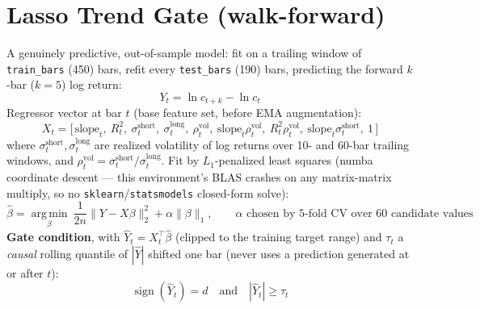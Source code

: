 \documentclass[11pt]{article}
\begin{document}
\section{Lasso Trend Gate (walk-forward)}
A genuinely predictive, out-of-sample model: fit on a trailing window of \texttt{train\_bars}
(450) bars, refit every \texttt{test\_bars} (190) bars, predicting the forward $k$-bar
($k=5$) log return:
\[
Y_t = \ln c_{t+k} - \ln c_t
\]
Regressor vector at bar $t$ (base feature set, before EMA augmentation):
\[
X_t = \big[\,\mathrm{slope}_t,\ R^2_t,\ \sigma^{\mathrm{short}}_t,\ \sigma^{\mathrm{long}}_t,\
\rho^{\mathrm{vol}}_t,\ \mathrm{slope}_t\rho^{\mathrm{vol}}_t,\ R^2_t\rho^{\mathrm{vol}}_t,\
\mathrm{slope}_t\sigma^{\mathrm{short}}_t,\ 1 \,\big]
\]
where $\sigma^{\mathrm{short}}_t,\sigma^{\mathrm{long}}_t$ are realized volatility of log returns
over 10- and 60-bar trailing windows, and $\rho^{\mathrm{vol}}_t = \sigma^{\mathrm{short}}_t/\sigma^{\mathrm{long}}_t$.
Fit by $L_1$-penalized least squares (numba coordinate descent --- this environment's BLAS crashes
on any matrix-matrix multiply, so no \texttt{sklearn}/\texttt{statsmodels} closed-form solve):
\[
\hat\beta = \operatorname*{arg\,min}_\beta \ \frac{1}{2n}\lVert Y - X\beta \rVert_2^2 + \alpha \lVert \beta \rVert_1,
\qquad \alpha \text{ chosen by 5-fold CV over 60 candidate values}
\]
\textbf{Gate condition}, with $\hat Y_t = X_t^\top\hat\beta$ (clipped to the training target range)
and $\tau_t$ a \emph{causal} rolling quantile of $|\hat Y|$ shifted one bar (never uses a
prediction generated at or after $t$):
\[
\operatorname{sign}(\hat Y_t) = d \quad \text{and} \quad |\hat Y_t| \ge \tau_t
\]
\end{document}

